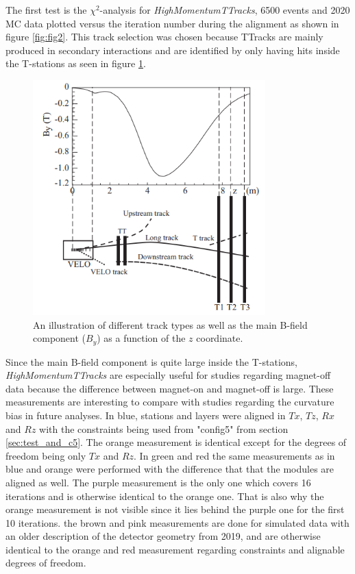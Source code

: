 The first test is the $\chi^2$-analysis for \textit{HighMomentumTTracks},
6500 events and 2020 MC data plotted versus the iteration number during the
alignment as shown in figure \ref{fig:fig2}.
This track selection was chosen because TTracks are mainly produced in secondary interactions and are identified by only having hits inside the T-stations as seen in figure \ref{fig:tracksel}.
\begin{figure}[!ht]
    \centering
    \includegraphics[width=0.8\textwidth]{plots/track_selection.png}
    \caption{An illustration of different track types as well as the main B-field component ($B_y$) as a function of the $z$ coordinate.}
    \label{fig:tracksel}
\end{figure}
Since the main B-field component is quite large inside the T-stations, \textit{HighMomentumTTracks} are especially useful for studies regarding magnet-off data because the difference between magnet-on and magnet-off is large.
These measurements are interesting to compare with studies regarding the curvature bias in future analyses.
In blue, stations and layers were aligned in $Tx$,
$Tz$, $Rx$ and $Rz$ with the constraints being used from "config5" from section \ref{sec:test_and_c5}. The orange
measurement is identical except for the degrees of freedom being only $Tx$ and $Rz$.
In green and red the same measurements as in blue and orange were performed with
the difference that that the modules are aligned as well.
The purple measurement is the only one which covers 16 iterations and is otherwise identical to the orange one. That is also why the orange measurement is not visible since it lies behind the purple one for the first 10 iterations.
the brown and pink measurements are done for simulated data with an older description of the detector geometry from 2019, and are otherwise identical to the orange and red measurement regarding constraints and alignable degrees of freedom.

